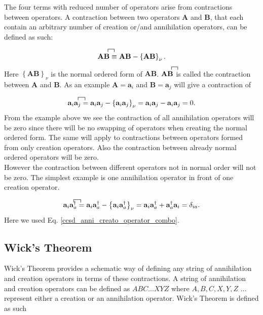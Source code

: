 \documentclass[a4paper,norsk,11pt,twoside]{report}
\begin{document}
The four terms with reduced number of operators arise from contractions between operators. A contraction between two operators $\textbf{A}$ and $\textbf{B}$, that each contain an arbitrary number of creation or/and annihilation operators, can be defined as such:

\begin{equation}
\contraction{}{\textbf{A}}{}{\textbf{B}}
\textbf{A}\textbf{B}
 \equiv \textbf{A}\textbf{B} - \left\{ \textbf{A}\textbf{B} \right\}_{\nu} .
\end{equation}
Here $\left\{ \textbf{A}\textbf{B} \right\}_{\nu}$ is the normal ordered form of $\textbf{A}\textbf{B}$. $\contraction{}{\textbf{A}}{}{\textbf{B}}
\textbf{A}\textbf{B}$ is called the contraction between $\textbf{A}$ and $\textbf{B}$. As an example $\textbf{A} = \textbf{a}_i$ and $\textbf{B} = \textbf{a}_j$ will give a contraction of

\begin{equation}
\contraction{}{\textbf{a}_i}{}{\textbf{a}_j}
\textbf{a}_i\textbf{a}_j
= \textbf{a}_i \textbf{a}_j - \left\{ \textbf{a}_i \textbf{a}_j \right\}_{\nu} = \textbf{a}_i \textbf{a}_j - \textbf{a}_i \textbf{a}_j = 0 . \label{wickexample1}
\end{equation}
From the example above we see the contraction of all annihilation operators will be zero since there will be no swapping of operators when creating the normal ordered form. The same will apply to contractions between operators formed from only creation operators. Also the contraction between already normal ordered operators will be zero. \\

However the contraction between different operators not in normal order will not be zero. The simplest example is one annihilation operator in front of one creation operator.

\begin{equation}
\contraction{}{\textbf{a}_i}{}{\textbf{a}^{\dag}_a}
\textbf{a}_i\textbf{a}^{\dag}_a
= \textbf{a}_i \textbf{a}^{\dag}_a - \left\{ \textbf{a}_i \textbf{a}^{\dag}_a \right\}_{\nu} = \textbf{a}_i \textbf{a}^{\dag}_a + \textbf{a}^{\dag}_a \textbf{a}_i = \delta_{ia} .
\end{equation}
Here we used Eq. \eqref{ccsd_anni_creato_operator_combo}.

\subsection{Wick's Theorem}
Wick's Theorem provides a schematic way of defining any string of annihilation and creation operators in terms of these contractions. A string of annihilation and creation operators can be defined as $ABC \dots XYZ$ where $A, B, C, X, Y, Z$ $\dots$ represent either a creation or an annihilation operator.  Wick's Theorem is defined as such
\end{document}
